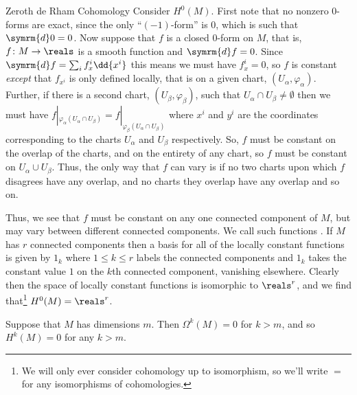 \documentclass[fleqn]{NotesClass}
\renewcommand{\dl}{\symrm{d}}
\begin{document}
    \begin{exm}{Zeroth de Rham Cohomology}{}
        Consider \(H^0(M)\).
        First note that no nonzero \(0\)-forms are exact, since the only \enquote{\((-1)\)-form} is \(0\), which is such that \(\dl 0 = 0\).
        Now suppose that \(f\) is a closed \(0\)-form on \(M\), that is, \(f \colon M \to \reals\) is a smooth function and \(\dl f = 0\).
        Since \(\dl f = \sum_i f_x^i \dd{x^i}\) this means we must have \(f_x^i = 0\), so \(f\) is constant \emph{except} that \(f_{x^i}\) is only defined locally, that is on a given chart, \((U_\alpha, \varphi_\alpha)\).
        Further, if there is a second chart, \((U_\beta, \varphi_\beta)\), such that \(U_\alpha \cap U_\beta \ne \emptyset\) then we must have \(f|_{\varphi_\alpha(U_\alpha \cap U_\beta)} = f|_{\varphi_\beta(U_\alpha \cap U_\beta)}\) where \(x^i\) and \(y^i\) are the coordinates corresponding to the charts \(U_\alpha\) and \(U_\beta\) respectively.
        So, \(f\) must be constant on the overlap of the charts, and on the entirety of any chart, so \(f\) must be constant on \(U_\alpha \cup U_\beta\).
        Thus, the only way that \(f\) can vary is if no two charts upon which \(f\) disagrees have any overlap, and no charts they overlap have any overlap and so on.
        
        Thus, we see that \(f\) must be constant on any one connected component of \(M\), but may vary between different connected components.
        We call such functions .
        If \(M\) has \(r\) connected components then a basis for all of the locally constant functions is given by \(1_k\) where \(1 \le k \le r\) labels the connected components and \(1_k\) takes the constant value \(1\) on the \(k\)th connected component, vanishing elsewhere.
        Clearly then the space of locally constant functions is isomorphic to \(\reals^r\), and we find that\footnote{We will only ever consider cohomology up to isomorphism, so we'll write \(=\) for any isomorphisms of cohomologies.} \(H^0(M) = \reals^r\). 
    \end{exm}
    
    \begin{exm}{}{}
        Suppose that \(M\) has dimensions \(m\).
        Then \(\Omega^k(M) = 0\) for \(k > m\), and so \(H^k(M) = 0\) for any \(k > m\).
    \end{exm}
    
\end{document}
